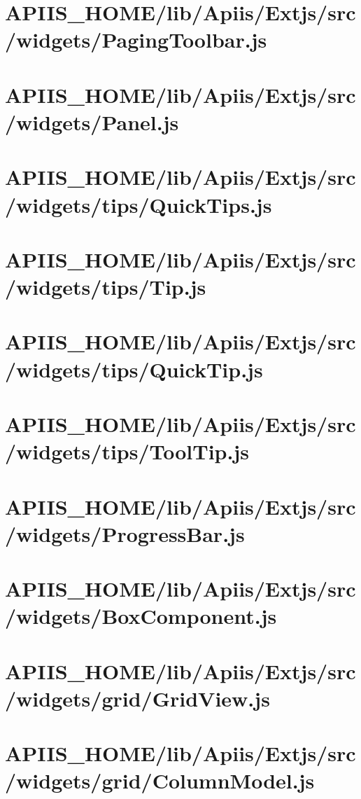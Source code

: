 \section{APIIS\_HOME/lib/Apiis/Extjs/src/widgets/PagingToolbar.js} 
\section{APIIS\_HOME/lib/Apiis/Extjs/src/widgets/Panel.js} 
\section{APIIS\_HOME/lib/Apiis/Extjs/src/widgets/tips/QuickTips.js} 
\section{APIIS\_HOME/lib/Apiis/Extjs/src/widgets/tips/Tip.js} 
\section{APIIS\_HOME/lib/Apiis/Extjs/src/widgets/tips/QuickTip.js} 
\section{APIIS\_HOME/lib/Apiis/Extjs/src/widgets/tips/ToolTip.js} 
\section{APIIS\_HOME/lib/Apiis/Extjs/src/widgets/ProgressBar.js} 
\section{APIIS\_HOME/lib/Apiis/Extjs/src/widgets/BoxComponent.js} 
\section{APIIS\_HOME/lib/Apiis/Extjs/src/widgets/grid/GridView.js} 
\section{APIIS\_HOME/lib/Apiis/Extjs/src/widgets/grid/ColumnModel.js} 
